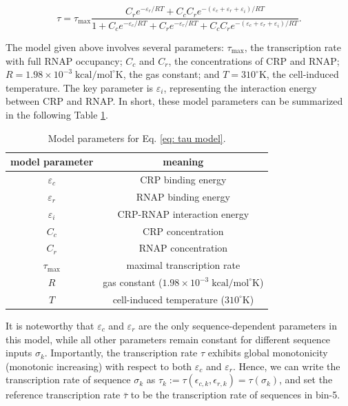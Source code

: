 \documentclass{article}
\begin{document}
\begin{equation}\label{eq: tau model}
    \tau = \tau_{\text{max}}\frac{C_r e^{-\varepsilon_r/RT}+C_c C_r e^{-(\varepsilon_c+\varepsilon_r+\varepsilon_i)/RT}}{1+C_c e^{-\varepsilon_c/RT}+C_r e^{-\varepsilon_r/RT}+C_c C_r e^{-(\varepsilon_c+\varepsilon_r+\varepsilon_i)/RT}}.
\end{equation}

The model given above involves several parameters: $\tau_{\text{max}}$, the transcription rate with full RNAP occupancy; $C_c$ and $C_r$, the concentrations of CRP and RNAP; $R=1.98\times 10^{-3} \;\text{kcal/mol}^\circ\text{K}$, the gas constant; and $T=310^\circ\text{K}$, the cell-induced temperature. The key parameter is $\varepsilon_i$, representing the interaction energy between CRP and RNAP. In short, these model parameters can be summarized in the following Table \ref{table: model params list}.

\begin{table}[htbp]
    \centering
\begin{tabular}{ | c c | }
\hline
 model parameter & meaning\\ 
 \hline
 \hline
 $\varepsilon_c$ & CRP binding energy \\
 $\varepsilon_r$ & RNAP binding energy \\
 $\varepsilon_i$ & CRP-RNAP interaction energy  \\
 $C_c$ & CRP concentration \\
 $C_r$ & RNAP concentration \\
 $\tau_{\text{max}}$ & maximal transcription rate \\
 $R$ & gas constant ($1.98\times 10^{-3} \;\text{kcal/mol}^\circ\text{K}$)\\ 
 $T$ & cell-induced temperature ($310^\circ\text{K}$)\\
 \hline
\end{tabular}
    \caption{Model parameters for Eq. \ref{eq: tau model}.}
    \label{table: model params list}
\end{table}

It is noteworthy that $\varepsilon_c$ and $\varepsilon_r$ are the only sequence-dependent parameters in this model, while all other parameters remain constant for different sequence inputs $\sigma_k$. Importantly, the transcription rate $\tau$ exhibits global monotonicity (monotonic increasing) with respect to both $\varepsilon_c$ and $\varepsilon_r$. Hence, we can write the transcription rate of sequence $\sigma_k$ as $\tau_k:=\tau(\epsilon_{c,k},\epsilon_{r,k})=\tau(\sigma_k)$, and set the reference transcription rate $\bar{\tau}$ to be the transcription rate of sequences in bin-5.
\end{document}
